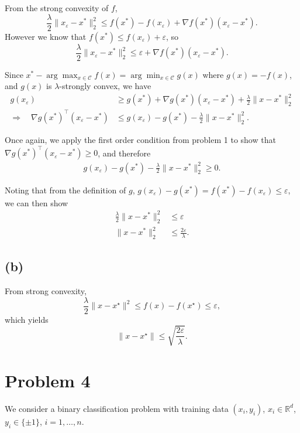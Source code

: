\documentclass[11pt]{article}
\begin{document}
\hrulefill

From the strong convexity of $f$,
\[
\frac{\lambda}{2}\|x_\varepsilon - x^* \|_2^2 \leq f(x^*) - f(x_\varepsilon) + \nabla f(x^*)(x_\varepsilon - x^*).
\]
However we know that $f(x^*) \leq f(x_\varepsilon) + \varepsilon$, so 
\[
\frac{\lambda}{2}\|x_\varepsilon - x^* \|_2^2 \leq \varepsilon + \nabla f(x^*)(x_\varepsilon - x^*).
\]

Since $x^* - \arg \max_{x \in \mathcal{C}} f(x) = \arg \min_{x \in \mathcal{C}} g(x)$ where $g(x) = -f(x)$, and $g(x)$ is $\lambda$-strongly convex, we have
\begin{align*}
    g(x_\varepsilon) &\geq g(x^*) + \nabla g(x^*)(x_\varepsilon - x^*) + \frac{\lambda}{2}\|x - x^*\|_2^2\\
    \Rightarrow \quad \nabla g(x^*)^\top(x_\varepsilon - x^*) &\leq g(x_\varepsilon) - g(x^*) - \frac{\lambda}{2}\|x - x^*\|_2^2.
\end{align*}

Once again, we apply the first order condition from problem 1 to show that $\nabla g(x^*)^\top(x_\varepsilon - x^*) \geq 0$, and therefore
\begin{align*}
g(x_\varepsilon) - g(x^*) - \frac{\lambda}{2}\|x - x^*\|_2^2 \geq 0.
\end{align*}

Noting that from the definition of $g$, $g(x_\varepsilon) - g(x^*) = f(x^*) - f(x_\varepsilon) \leq \varepsilon$, we can then show
\begin{align*}
\frac{\lambda}{2}\|x - x^*\|_2^2 &\leq \varepsilon \\
\|x - x^*\|_2^2 &\leq \frac{2\varepsilon}{\lambda}.
\end{align*}

\hrulefill

\subsection*{(b)}

From strong convexity,
\[
\frac{\lambda}{2}\|x-x^\star\|^2 \le f(x) - f(x^\star) \le \varepsilon,
\]
which yields
\[
\|x-x^\star\| \le \sqrt{\frac{2\varepsilon}{\lambda}}.
\]

\hrulefill

\section*{Problem 4}
We consider a binary classification problem with training data
$(x_i, y_i)$, $x_i \in \mathbb{R}^d$, $y_i \in \{\pm 1\}$, $i = 1, \dots, n$.
\end{document}
